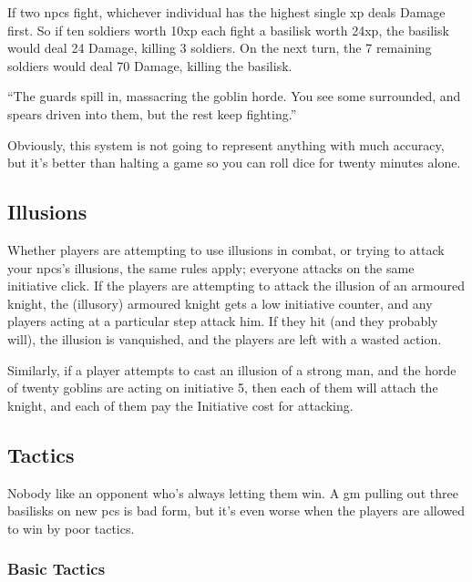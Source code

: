 \begin{multicols}{2}
\begin{exampletext}
\end{exampletext}

If two \glspl{npc} fight, whichever individual has the highest single \gls{xp} deals Damage first.
So if ten soldiers worth 10\gls{xp} each fight a basilisk worth 24\gls{xp}, the basilisk would deal 24 Damage, killing 3 soldiers.
On the next turn, the 7 remaining soldiers would deal 70 Damage, killing the basilisk.

\begin{exampletext}

	``The guards spill in, massacring the goblin horde.
	You see some surrounded, and spears driven into them, but the rest keep fighting.''

\end{exampletext}

Obviously, this system is not going to represent anything with much accuracy, but it's better than halting a game so you can roll dice for twenty minutes alone.

\subsection{Illusions}

Whether players are attempting to use illusions in combat, or trying to attack your \glspl{npc}'s illusions, the same rules apply; everyone attacks on the same initiative click.
If the players are attempting to attack the illusion of an armoured knight, the (illusory) armoured knight gets a low initiative counter, and any players acting at a particular step attack him.
If they hit (and they probably will), the illusion is vanquished, and the players are left with a wasted action.

Similarly, if a player attempts to cast an illusion of a strong man, and the horde of twenty goblins are acting on initiative 5, then each of them will attach the knight, and each of them pay the Initiative cost for attacking.

\subsection{Tactics}

Nobody like an opponent who's always letting them win.
A \gls{gm} pulling out three basilisks on new \glspl{pc} is bad form, but it's even worse when the players are allowed to win by poor tactics.

\subsubsection{Basic Tactics}


\end{multicols}
